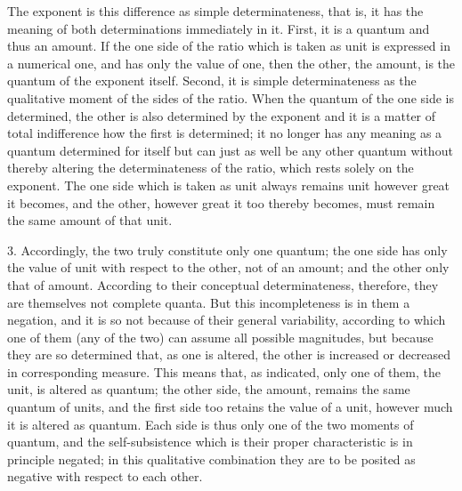 The exponent is this difference as simple determinateness,
that is, it has the meaning of both
determinations immediately in it.
First, it is a quantum and thus an amount.
If the one side of the ratio which is taken as
unit is expressed in a numerical one,
and has only the value of one,
then the other, the amount, is
the quantum of the exponent itself.
Second, it is simple determinateness as
the qualitative moment of the sides of the ratio.
When the quantum of the one side is determined,
the other is also determined by the exponent
and it is a matter of total indifference
how the first is determined;
it no longer has any meaning
as a quantum determined for itself
but can just as well be any other
quantum without thereby altering
the determinateness of the ratio,
which rests solely on the exponent.
The one side which is taken as unit always
remains unit however great it becomes,
and the other, however great it too thereby becomes,
must remain the same amount of that unit.

3. Accordingly, the two truly constitute only one quantum;
the one side has only the value of unit
with respect to the other, not of an amount;
and the other only that of amount.
According to their conceptual determinateness,
therefore, they are themselves not complete quanta.
But this incompleteness is in them a negation,
and it is so not because of their general variability,
according to which one of them (any of the two)
can assume all possible magnitudes,
but because they are so determined that, as one is altered,
the other is increased or decreased in corresponding measure.
This means that, as indicated, only one of them,
the unit, is altered as quantum;
the other side, the amount, remains the same quantum of units,
and the first side too retains the value of a unit,
however much it is altered as quantum.
Each side is thus only one of the two moments of quantum,
and the self-subsistence which is their proper characteristic
is in principle negated;
in this qualitative combination they are to be
posited as negative with respect to each other.


